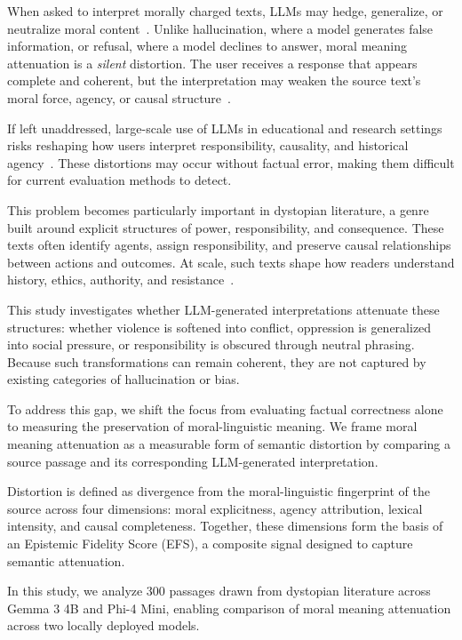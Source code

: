 \documentclass[10pt, conference]{IEEEtran}
\begin{document}
When asked to interpret morally charged texts, LLMs may hedge, generalize, or neutralize moral content~\cite{barnhart2025alignment, kay2024epistemic}. Unlike hallucination, where a model generates false information, or refusal, where a model declines to answer, moral meaning attenuation is a \textit{silent} distortion. The user receives a response that appears complete and coherent, but the interpretation may weaken the source text's moral force, agency, or causal structure~\cite{barnhart2025alignment, williamson2024deception}.

If left unaddressed, large-scale use of LLMs in educational and research settings risks reshaping how users interpret responsibility, causality, and historical agency~\cite{kashiramka2024ai, mckelvie2025history}. These distortions may occur without factual error, making them difficult for current evaluation methods to detect.

This problem becomes particularly important in dystopian literature, a genre built around explicit structures of power, responsibility, and consequence. These texts often identify agents, assign responsibility, and preserve causal relationships between actions and outcomes. At scale, such texts shape how readers understand history, ethics, authority, and resistance~\cite{kashiramka2024ai, mckelvie2025history, zhou2025literature}.

This study investigates whether LLM-generated interpretations attenuate these structures: whether violence is softened into conflict, oppression is generalized into social pressure, or responsibility is obscured through neutral phrasing. Because such transformations can remain coherent, they are not captured by existing categories of hallucination or bias.

To address this gap, we shift the focus from evaluating factual correctness alone to measuring the preservation of moral-linguistic meaning. We frame moral meaning attenuation as a measurable form of semantic distortion by comparing a source passage and its corresponding LLM-generated interpretation.

Distortion is defined as divergence from the moral-linguistic fingerprint of the source across four dimensions: moral explicitness, agency attribution, lexical intensity, and causal completeness. Together, these dimensions form the basis of an Epistemic Fidelity Score (EFS), a composite signal designed to capture semantic attenuation.

In this study, we analyze 300 passages drawn from dystopian literature across Gemma 3 4B and Phi-4 Mini, enabling comparison of moral meaning attenuation across two locally deployed models.
\end{document}
